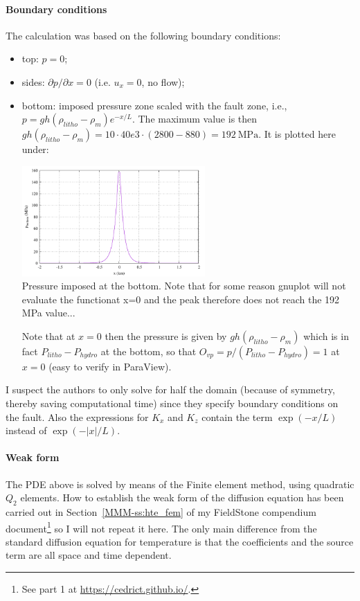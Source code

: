 \paragraph{Boundary conditions}

The calculation was based on the following boundary conditions: 
\begin{itemize}
\item top: $p=0$;
\item sides:  $\partial p/\partial x =0$ (i.e. $u_x=0$, no flow);
\item bottom: imposed pressure zone scaled
with the fault zone, i.e., $p = g h (\rho_{litho} -\rho_m) e^{-x/L}$.
The maximum value is then $g h (\rho_{litho} -\rho_m) 
=10\cdot 40e3 \cdot(2800-880)=192~\si{\mega\pascal}$.
It is plotted here under: 
\begin{center}
\includegraphics[width=7cm]{python_codes/fieldstone_126/images/pbottom}\\
{\captionfont Pressure imposed at the bottom. Note that for some reason 
gnuplot will not evaluate the functionat x=0 and the peak therefore does not 
reach the 192 MPa value...}
\end{center}

Note that at $x=0$ then the pressure is given by $g h (\rho_{litho} -\rho_m)$
which is in fact $P_{litho}-P_{hydro}$ at the bottom, so that $O_{vp}=p/(P_{litho}-P_{hydro})=1$
at $x=0$ (easy to verify in ParaView). 

\end{itemize}
I suspect the authors to only solve for half the domain (because of symmetry, thereby 
saving computational time) since they 
specify boundary conditions on the fault. Also the expressions for $K_x$ and $K_z$ 
contain the term $\exp(-x/L)$ instead of $\exp(-|x|/L)$.

\paragraph{Weak form}

The PDE above is solved by means of the Finite element method, using 
quadratic $Q_2$ elements.
How to establish the weak form of the diffusion equation has been 
carried out in Section~\ref{MMM-ss:hte_fem} of my FieldStone compendium 
document\footnote{See part 1 at \url{https://cedrict.github.io/}.}
so I will not repeat it here. 
The only main difference from the standard diffusion equation for temperature
is that the coefficients and the source term are all space and time dependent.

